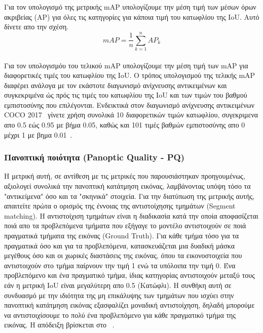\documentclass[12pt]{article}
\numberwithin{equation}{section}
\begin{document}
Για τον υπολογισμό της μετρικής mAP υπολογίζουμε την μέση τιμή των μέσων όρων ακριβείας (AP) για όλες τις κατηγορίες για κάποια τιμή του κατωφλίου της IoU. Αυτό δίνετε απο την σχέση. \\

\begin{equation}
mAP = \frac{1}{n} \sum_{k=1}^{n} AP_k
\end{equation}\\

Για τον υπολογισμόυ του τελικού mAP υπολογίζουμε την μέση τιμή των mAP για διαφορετικές τιμές του κατωφλίου της IoU. Ο τρόπος υπολογισμού της τελικής mAP διαφέρει ανάλογα με τον εκάστοτε διαγωνισμό ανίχνευσης αντικειμένων και συγκεκριμένα ώς πρός τις τιμές του κατωφλίου της IoU και των τιμών του βαθμού εμπιστοσύνης που επιλέγονται. Ενδεικτικά στον διαγωνισμό ανίχνευσης αντικειμένων COCO 2017~\cite{lin2015microsoftcococommonobjects} γίνετε χρήση συνολικά 10 διαφορετικών τιμών κατωφλίου, συγεκριμενα απο 0.5 εώς 0.95 με βήμα 0.05, καθώς και 101 τιμές βαθμών εμπιστοσύνης απο 0 μέχρι 1 με βημα 0.01~\cite{shah2022map}. \\



\subsubsection{Πανοπτική ποιότητα (Panoptic Quality - PQ)}

Η μετρική αυτή, σε αντίθεση με τις μετρικές που παρουσιάστηκαν προηγουμένως, αξιολογεί συνολικά την πανοπτική κατάτμηση εικόνας, λαμβάνοντας υπόψη τόσο τα "αντικείμενα" όσο και τα "σκηνικά" στοιχεία. Για την διατύπωση της μετρικής αυτής, απαιτείτε πρώτα ο ορισμός της έννοιας της αντιστοίχησης τμημάτων (Segment matching). Η αντιστοίχιση τμημάτων είναι η διαδικασία κατά την οποία αποφασίζεται ποιά απο τα προβλεπόμενα τμήματα που εξήγαγε το μοντέλο αντιστοιχούν σε ποιά πραγματικά τμήματα της εικόνας (Ground Truth). Για κάθε τμήμα τόσο για τα πραγματικά όσο και για τα προβλεπόμενα, κατασκευάζεται μια δυαδική μάσκα μεγέθους όσο και οι χωρικές διαστάσεις της εικόνας, όπου τα εικονοστοιχεία που αντιστοιχούν στο τμήμα παίρνουν την τιμή 1 ενώ τα υπόλοιπα την τιμή 0. Ένα προβλεπόμενο και ένα πραγματικό τμήμα, ίδιας κατηγορίας αντιστοιχούν μεταξύ τους εάν η μετρική IoU είναι μεγαλύτερη απο 0.5 (Κατώφλι). Η συνθήκη αυτή σε συνδυασμό με την ιδιότητα της μη επικάλυψης των τμημάτων που ισχύει στην πανοπτική κατάτμηση εικόνας εξασφαλίζει μοναδική αντιστοίχηση, δηλαδή μπορούμε να αντιστοιχίσουμε το πολύ ένα προβλεπόμενο για κάθε πραγματικό τμήμα της εικόνας. Η απόδειξη βρίσκεται στο ~\cite{Kirillov_2019_CVPR}.\\
\end{document}
